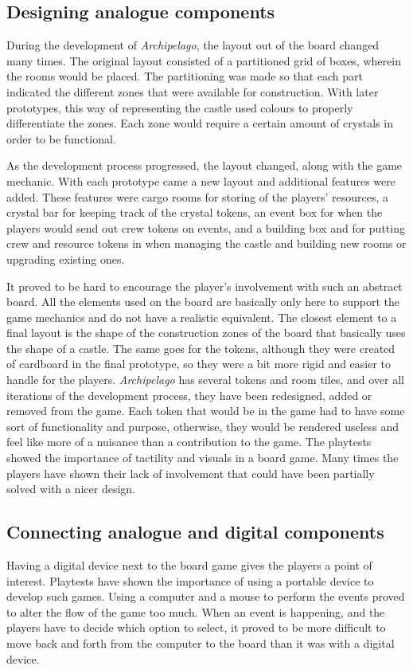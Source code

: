 \subsection{Designing analogue components}
During the development of \textit{Archipelago}, the layout out of the board changed many times. The original layout consisted of a partitioned grid of boxes, wherein the rooms would be placed. The partitioning was made so that each part indicated the different zones that were available for construction. With later prototypes, this way of representing the castle used colours to properly differentiate the zones. Each zone would require a certain amount of crystals in order to be functional. 

As the development process progressed, the layout changed, along with the game mechanic. With each prototype came a new layout and additional features were added. These features were cargo rooms for storing of the players' resources, a crystal bar for keeping track of the crystal tokens, an event box for when the players would send out crew tokens on events, and a building box and for putting crew and resource tokens in when managing the castle and building new rooms or upgrading existing ones. 

It proved to be hard to encourage the player's involvement with such an abstract board. All the elements used on the board are basically only here to support the game mechanics and do not have a realistic equivalent. The closest element to a final layout is the shape of the construction zones of the board that basically uses the shape of a castle. The same goes for the tokens, although they were created of cardboard in the final prototype, so they were a bit more rigid and easier to handle for the players. \textit{Archipelago} has several tokens and room tiles, and over all iterations of the development process, they have been redesigned, added or removed from the game. Each token that would be in the game had to have some sort of functionality and purpose, otherwise, they would be rendered useless and feel like more of a nuisance than a contribution to the game. The playtests showed the importance of tactility and visuals in a board game. Many times the players have shown their lack of involvement that could have been partially solved with a nicer design.

\subsection{Connecting analogue and digital components}
Having a digital device next to the board game gives the players a point of interest. Playtests have shown the importance of using a portable device to develop such games. Using a computer and a mouse to perform the events proved to alter the flow of the game too much. When an event is happening, and the players have to decide which option to select, it proved to be more difficult to move back and forth from the computer to the board than it was with a digital device.

